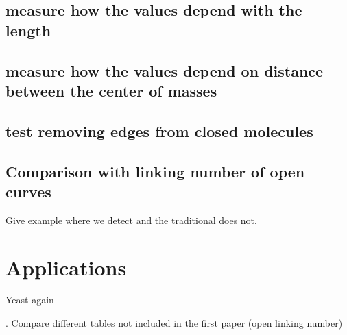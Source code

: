\documentclass{iopart}
\begin{document}
\subsection{measure how the values depend with the length}
\subsection{measure how the values depend on distance between the center of masses}
\subsection{ test removing edges from closed molecules}
\subsection{Comparison  with linking number of open curves}
Give example where we detect and the traditional does not. 






\medskip
\section{Applications}
Yeast again

. Compare different tables not included in the first paper (open linking number) 
\end{document}
